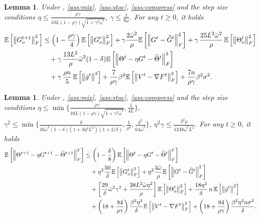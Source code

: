 \documentclass[10pt]{article} %
\theoremstyle{plain}
\newtheorem{lemma}[theorem]{Lemma}
\theoremstyle{definition}
\theoremstyle{remark}
\newcommand{\grdF}{\nabla F}
\newcommand{\bw}{\bar{\omega}}
\newcommand{\avgg}{\bar{g}}
\newcommand{\norm}[1]{\left\| #1 \right\|}
\newcommand{\nl}{\nonumber\\}
\newcommand{\hatTheta}{\widehat{\Theta}}
\newcommand{\hatG}{\widehat{G}}
\begin{document}
\begin{lemma}\label{lem:gt_new} Under , \ref{ass:mix}, \ref{ass:stoc}, \ref{ass:compress} and the step size conditions $\eta \leq \frac{ \rho \gamma }{ 10 L (1-\rho\gamma) \sqrt{1 + \gamma^2 \bw^2} }$, $\gamma \leq \frac{1}{8 \bw}$. For any $t \geq 0$, it holds
    \begin{align}
    \mathbb{E} \left[ \norm{G_o^{t+1}}_F^2 \right] & \leq \left( 1 - \frac{ \rho \gamma }{4} \right) \mathbb{E} \left[ \norm{ G_o^t }_F^2 \right] + \gamma \frac{ 2 \bw^2}{ \rho } \mathbb{E} \left[ \norm{ G^t - \hatG^t }_F^2 \right] + \gamma \, \frac{25 L^2 \bw^2}{\rho} \, \mathbb{E} \left[ \norm{ \Theta_o^t}_F^2 \right] \\
    & \quad + \gamma \, \frac{13 L^2}{ \rho } \bw^2 (1 - \delta) \mathbb{E} \left[ \norm{ \Theta^t - \eta G^t - \hatTheta^t }_F^2 \right] \nl 
    & \quad + \gamma \, \frac{ \rho n}{5} \, \mathbb{E} \left[ \norm{ \avgg^t }^2 \right] + \frac{7}{ \rho \gamma } \beta^2 \mathbb{E} \left[ \norm{V^t - \grdF^t}_F^2 \right] + \frac{7n }{\rho \gamma} \beta^2 \sigma^2 . \notag
    \end{align}
\end{lemma}
\begin{lemma} \label{lem:thetahat_new} Under , \ref{ass:mix}, \ref{ass:stoc}, \ref{ass:compress} and the step size conditions $\eta \leq \min \{ \frac{ \rho \gamma }{ 10 L (1-\rho\gamma) \sqrt{1 + \gamma^2 \bw^2} },  \frac{1}{4L} \}$,
$\gamma^2 \leq \min \{\frac{\delta}{ 16 \bw^2 (1-\delta) (1 + 3\eta^2 L^2) (1 + 2/\delta)}, \frac{1}{\rho^2}, \frac{\delta^2}{64\bw^2}\}$, $\eta^2 \gamma \leq \frac{\delta^2 \rho}{1248 \bw^2 L^2}$. For any $t \geq 0$, it holds
    \begin{align}
    \mathbb{E} \left[ \norm{\Theta^{t+1}- \eta G^{t+1}- \hatTheta^{t+1}}_F^2 \right] & \leq \left(1-\frac{\delta}{8} \right) \mathbb{E} \left[ \norm{\Theta^t - \eta G^t - \hatTheta^t}_F^2 \right] \\
        & \quad + \eta^2 \frac{50}{\delta} \mathbb{E} \left[ \norm{G_o^t}_F^2 \right] + \eta^2 \frac{3 \bw}{\rho} \mathbb{E} \left[ \norm{G^{t} - \hatG^t}_F^2 \right] \nl 
        & \quad + \left[ \frac{29}{\delta} \bw^2 \gamma^2 + \frac{38 L^2 \bw \eta^2}{\rho} \right] \mathbb{E} \left[ \norm{\Theta_o^t}_F^2 \right] + \frac{18 \eta^2}{\delta} \, n \, \mathbb{E}  \left[ \norm{ \avgg^t }^2 \right] \nl 
        & \quad + \left( 18 + \frac{84}{\rho\gamma} \right)\frac{ \beta^2\eta^2 }{\delta} \mathbb{E} \left[ \norm{ V^t - \grdF^t }_F^2 \right] + \left( 18 + \frac{84}{\rho \gamma} \right) \frac{\beta^2 \eta^2 n\sigma^2}{\delta} . \notag
    \end{align}
\end{lemma}
\end{document}
